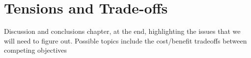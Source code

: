 \chapter[Tensions and Trade-offs]{Tensions and Trade-offs}

Discussion and conclusions chapter, at the end, highlighting the
issues that we will need to figure out. Possible topics include the
cost/benefit tradeoffs between competing objectives
